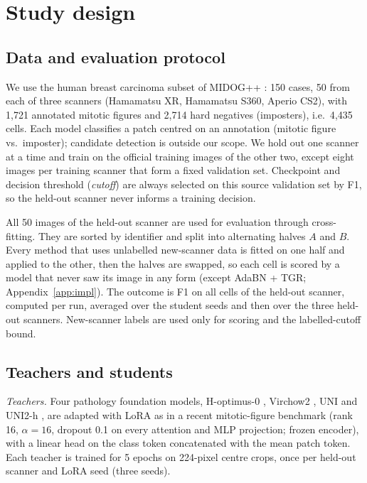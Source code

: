 \section{Study design}
\label{sec:design}

\subsection{Data and evaluation protocol}

We use the human breast carcinoma subset of MIDOG++ \citep{aubreville2023comprehensive}: 150 cases, 50 from each of
three scanners (Hamamatsu XR, Hamamatsu S360, Aperio CS2), with 1{,}721 annotated mitotic figures and 2{,}714 hard
negatives (imposters), i.e.\ 4{,}435 cells. Each model classifies a patch centred on an annotation (mitotic figure vs.\
imposter); candidate detection is outside our scope. We hold out one scanner at a time and train on the official training images of the other two, except eight images per training scanner that
form a fixed validation set. Checkpoint and decision threshold (\emph{cutoff}) are always selected on this source
validation set by F1, so the held-out scanner never informs a training decision.

All 50 images of the held-out scanner are used for evaluation through cross-fitting. They are sorted by
identifier and split into alternating halves $A$ and $B$. Every method that uses unlabelled new-scanner data is fitted
on one half and applied to the other, then the halves are swapped, so each cell is scored by a model that never saw its
image in any form (except AdaBN + TGR; Appendix~\ref{app:impl}). The outcome is F1 on all cells of the held-out scanner, computed per run, averaged over the student
seeds and then over the three held-out scanners. New-scanner labels are used only for scoring and the
labelled-cutoff bound.

\subsection{Teachers and students}

\emph{Teachers.} Four pathology foundation models, H-optimus-0 \citep{hoptimus0}, Virchow2 \citep{zimmermann2024virchow2},
UNI \citep{chen2024uni} and UNI2-h \citep{uni2h}, are adapted with LoRA \citep{hu2022lora} as in a recent
mitotic-figure benchmark \citep{ammeling2026benchmarking} (rank 16, $\alpha=16$, dropout 0.1 on every attention and MLP
projection; frozen encoder), with a linear head on the class token concatenated with the mean patch token. Each teacher is
trained for 5 epochs on 224-pixel centre crops, once per held-out scanner and LoRA seed (three seeds).

